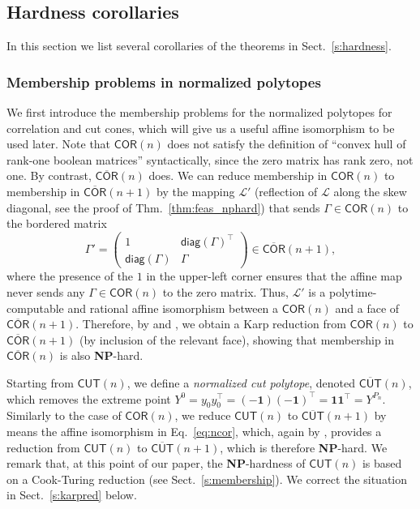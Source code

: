 \documentclass[envcountsect,envcountsame]{svjour3}
\theoremstyle{changebreak}                %
\newcommand{\transpose}[1]{{#1}^{\top}}
\newcommand{\COR}[1]{\mathsf{COR}(#1)}
\newcommand{\nCOR}[1]{\mathsf{\overline{COR}}(#1)}
\newcommand{\CUT}[1]{\mathsf{CUT}(#1)}
\newcommand{\nCUT}[1]{\mathsf{\overline{CUT}}(#1)}
\newcommand{\diag}[1]{\mathsf{diag}(#1)}
\begin{document}
\subsection{Hardness corollaries}
\label{s:corollaries}
In this section we list several corollaries of the theorems in Sect.~\ref{s:hardness}.

\subsubsection{Membership problems in normalized polytopes}
\label{s:normalized}
We first introduce the membership problems for the normalized polytopes for correlation and cut cones, which will give us a useful affine isomorphism to be used later. Note that $\COR{n}$ does not satisfy the definition of ``convex hull of rank-one boolean matrices'' syntactically, since the zero matrix has rank zero, not one. By contrast, $\nCOR{n}$ does. We can reduce membership in $\COR{n}$ to membership in $\nCOR{n+1}$ by the mapping $\mathscr{L}'$ (reflection of $\mathscr{L}$ along the skew diagonal, see the proof of Thm.~\ref{thm:feas_nphard}) that sends $\Gamma\in\COR{n}$ to the bordered matrix
\begin{equation}
\Gamma' = \left(\begin{array}{cc} 1 & \transpose{\diag{\Gamma}} \\ \diag{\Gamma} & \Gamma\end{array}\right) \in\nCOR{n+1},
\label{eq:ncor}
\end{equation}
where the presence of the $1$ in the upper-left corner ensures that the affine map never sends any $\Gamma\in\COR{n}$ to the zero matrix. Thus, $\mathscr{L}'$ is a polytime-computable and rational affine isomorphism between a $\COR{n}$ and a face of $\nCOR{n+1}$. Therefore, by \cite{pitowsky} and \cite{gls}, we obtain a Karp reduction from $\COR{n}$ to $\nCOR{n+1}$ (by inclusion of the relevant face), showing that membership in $\nCOR{n}$ is also \textbf{NP}-hard. 

Starting from $\CUT{n}$, we define a \textit{normalized cut polytope}, denoted $\nCUT{n}$, which removes the extreme point $Y^0=y_0\transpose{y}_0=(-\mathbf{1})\transpose{(-\mathbf{1})}=\mathbf{1}\transpose{\mathbf{1}}=Y^{P_n}$. Similarly to the case of $\COR{n}$, we reduce $\CUT{n}$ to $\nCUT{n+1}$ by means the affine isomorphism in Eq.~\eqref{eq:ncor}, which, again by \cite{gls}, provides a reduction from $\CUT{n}$ to $\nCUT{n+1}$, which is therefore \textbf{NP}-hard. We remark that, at this point of our paper, the \textbf{NP}-hardness of $\CUT{n}$ is based on a Cook-Turing reduction (see Sect.~\ref{s:membership}). We correct the situation in Sect.~\ref{s:karpred} below.
\end{document}
